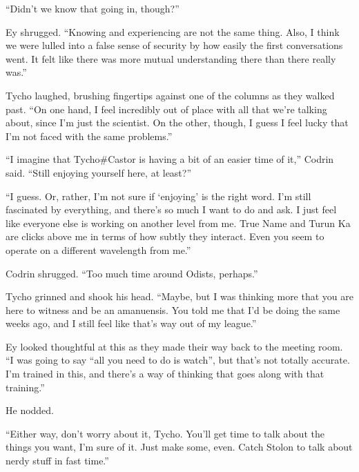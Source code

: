 ``Didn't we know that going in, though?''

Ey shrugged. ``Knowing and experiencing are not the same thing. Also, I think we were lulled into a false sense of security by how easily the first conversations went. It felt like there was more mutual understanding there than there really was.''

Tycho laughed, brushing fingertips against one of the columns as they walked past. ``On one hand, I feel incredibly out of place with all that we're talking about, since I'm just the scientist. On the other, though, I guess I feel lucky that I'm not faced with the same problems.''

``I imagine that Tycho\#Castor is having a bit of an easier time of it,'' Codrin said. ``Still enjoying yourself here, at least?''

``I guess. Or, rather, I'm not sure if `enjoying' is the right word. I'm still fascinated by everything, and there's so much I want to do and ask. I just feel like everyone else is working on another level from me. True Name and Turun Ka are clicks above me in terms of how subtly they interact. Even you seem to operate on a different wavelength from me.''

Codrin shrugged. ``Too much time around Odists, perhaps.''

Tycho grinned and shook his head. ``Maybe, but I was thinking more that you are here to witness and be an amanuensis. You told me that I'd be doing the same weeks ago, and I still feel like that's way out of my league.''

Ey looked thoughtful at this as they made their way back to the meeting room. ``I was going to say ``all you need to do is watch'', but that's not totally accurate. I'm trained in this, and there's a way of thinking that goes along with that training.''

He nodded.

``Either way, don't worry about it, Tycho. You'll get time to talk about the things you want, I'm sure of it. Just make some, even. Catch Stolon to talk about nerdy stuff in fast time.''

